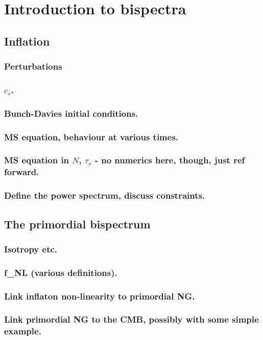 %
\chapter{Introduction to bispectra}
\section{Inflation}
    \subsection{Perturbations}
    \subsection{$c_s$.}
    \subsection{Bunch-Davies initial conditions.}
    \subsection{MS equation, behaviour at various times.}
    \subsection{MS equation in $N$, $\tau_s$ - no numerics here, though, just ref forward.}
    \subsection{Define the power spectrum, discuss constraints.}
\section{The primordial bispectrum}
    \subsection{Isotropy etc.}
    \subsection{f_{NL} (various definitions).}
    \subsection{Link inflaton non-linearity to primordial NG.}
    \subsection{Link primordial NG to the CMB, possibly with some simple example.}
